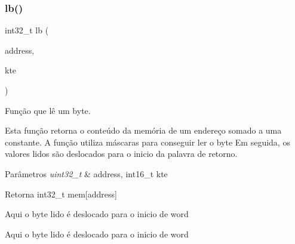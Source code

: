 \mbox{\label{memory_8h_a7dd0579e9662cb4b5ae5ccabedef4fdc}} 
\subsubsection{lb()}
{\footnotesize\ttfamily int32\+\_\+t lb (\begin{DoxyParamCaption}\item[{uint32\+\_\+t}]{address,  }\item[{int16\+\_\+t}]{kte }\end{DoxyParamCaption})}



Função que lê um byte. 

Esta função retorna o conteúdo da memória de um endereço somado a uma constante. A função utiliza máscaras para conseguir ler o byte Em seguida, os valores lidos são deslocados para o inicio da palavra de retorno. 
\begin{DoxyParams}{Parâmetros}
{\em uint32\+\_\+t} & address, int16\+\_\+t kte \\
\hline
\end{DoxyParams}
\begin{DoxyReturn}{Retorna}
int32\+\_\+t mem[address] 
\end{DoxyReturn}
Aqui o byte lido é deslocado para o inicio de word

Aqui o byte lido é deslocado para o inicio de word


